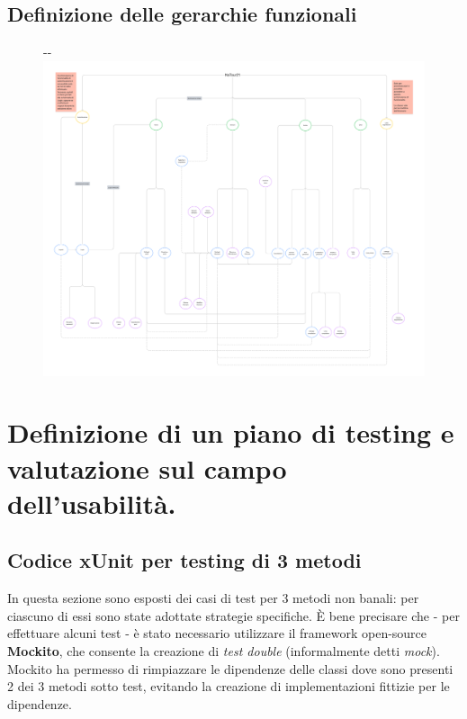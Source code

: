 \documentclass{natourDoc}
\begin{document}
\subsection{Definizione delle gerarchie funzionali}
\begin{figure}[!ht]
	\begin{adjustwidth}{-\oddsidemargin-1in}{-\rightmargin}
		\centering
		\includegraphics[width=\paperwidth]{./mockup/Gerarchie-funz.pdf}
	\end{adjustwidth}
\end{figure}

\newpage

\section{Definizione di un piano di testing e valutazione sul campo dell’usabilità.}

\subsection{Codice xUnit per testing di 3 metodi}
In questa sezione sono esposti dei casi di test per 3 metodi non banali: per ciascuno di essi sono state adottate strategie specifiche.
È bene precisare che - per effettuare alcuni test - è stato necessario utilizzare il framework open-source \textbf{Mockito},
che consente la creazione di \textit{test double} (informalmente detti \textit{mock}). \\
Mockito ha permesso di rimpiazzare le dipendenze delle classi dove sono presenti 2 dei 3 metodi sotto test, evitando
la creazione di implementazioni fittizie per le dipendenze.
\end{document}
